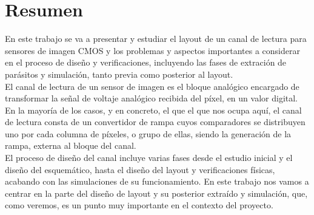 \chapter*{Resumen}
\label{cap:resumen}

En este trabajo se va a presentar y estudiar el layout de un canal de lectura
para sensores de imagen CMOS y los problemas y aspectos importantes a considerar
en el proceso de diseño y verificaciones, incluyendo las fases de extración de
parásitos y simulación, tanto previa como posterior al layout.\\

El canal de lectura de un sensor de imagen es el bloque analógico encargado de
transformar la señal de voltaje analógico recibida del píxel, en un valor digital.
En la mayoría de los casos, y en concreto, el que el que nos ocupa aquí, el canal de lectura
consta de un convertidor de rampa cuyos comparadores se distribuyen uno por cada
columna de píxeles, o grupo de ellas, siendo la generación de la rampa, externa
al bloque del canal.\\

El proceso de diseño del canal incluye varias fases desde el estudio inicial y el diseño
del esquemático, hasta el diseño del layout y verificaciones físicas, acabando con
las simulaciones de su funcionamiento. En este trabajo nos vamos a centrar en la
parte del diseño de layout y su posterior extraído y simulación, que, como veremos,
es un punto muy importante en el contexto del proyecto.\\
